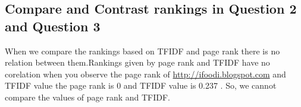 \documentclass[12pt]{article}
\begin{document}
\subsection{Compare and Contrast rankings in Question 2 and Question 3}

When we compare the rankings based on TFIDF and page rank there is no relation between them.Rankings given by page rank and TFIDF have no corelation when you observe the page rank of \url {http://ifoodi.blogspot.com} and TFIDF value the page rank is 0 and TFIDF value is 0.237 . So, we cannot compare the values of page rank and TFIDF.


\newpage


\cite{*}
\end{document}
